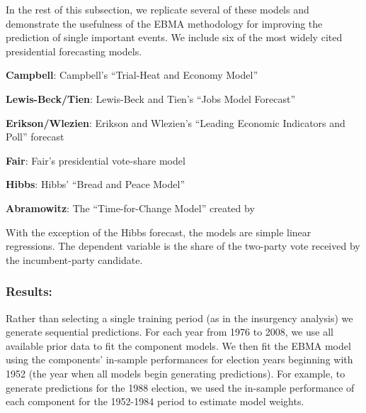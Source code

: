 In the rest of this subsection, we replicate several of these models and
demonstrate the usefulness of the EBMA methodology for improving the
prediction of single important events.  We include six of the most widely cited
presidential forecasting models.
\begin{list}{}{\leftmargin=1em}
\item \textbf{Campbell}: Campbell's ``Trial-Heat and Economy Model''
  \citep{Campbell:2008}
\item \textbf{Lewis-Beck/Tien}: Lewis-Beck and Tien's ``Jobs Model Forecast'' \citep{Lewis-Beck:Tien:2008}
\item \textbf{Erikson/Wlezien}: Erikson and Wlezien's ``Leading Economic Indicators
  and Poll'' forecast
\item \textbf{Fair}: Fair's presidential vote-share model
\item \textbf{Hibbs}: Hibbs' ``Bread and Peace Model'' \citep{Hibbs:2000}
\item \textbf{Abramowitz}: The ``Time-for-Change Model'' created by
  \citet{Abramowitz:2008}
\end{list}
\noindent With the exception of the Hibbs forecast, the models are
simple linear regressions. The dependent variable is the share of the
two-party vote received by the incumbent-party candidate.


\subsubsection{Results:}

Rather than selecting a single training period (as in the insurgency
analysis) we generate sequential predictions.  For each year from 1976
to 2008, we use all available prior data to fit the component
models.  We then fit the EBMA model using the
components' in-sample performances for election years beginning with
1952 (the year when all models begin generating predictions).  For
example, to generate predictions for the 1988 election, we used the
in-sample performance of each component for the 1952-1984 period to
estimate model weights.


